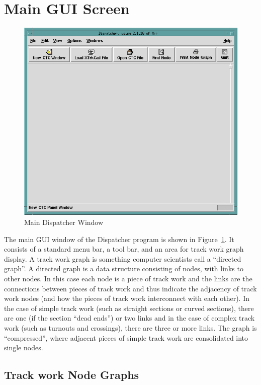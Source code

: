 \section{Main GUI Screen}

\begin{figure}[hbpt]
\begin{centering}
\includegraphics[width=5in]{DISPMainGUI.png}
\caption{Main Dispatcher Window}
\label{fig:dispatcher:mainDispatcher}
\end{centering}
\end{figure}
The main GUI window of the Dispatcher program is shown in
Figure~\ref{fig:dispatcher:mainDispatcher}. It consists of a standard
menu bar, a tool bar, and an area for track work graph display. A
track work graph is something computer scientists call a ``directed
graph''.  A directed graph is a data structure consisting of nodes,
with links to other nodes.  In this case each node is a piece of
track work and the links are the connections between pieces of track work
and thus indicate the adjacency of track work nodes (and how the pieces
of track work interconnect with each other).  In the case of simple
track work (such as straight sections or curved sections), there are one
(if the section ``dead ends'') or two links and in the case of complex
track work (such as turnouts and crossings), there are three or more
links.  The graph is ``compressed'', where adjacent pieces of simple
track work are consolidated into single nodes. 

\subsection{Track work Node Graphs}

